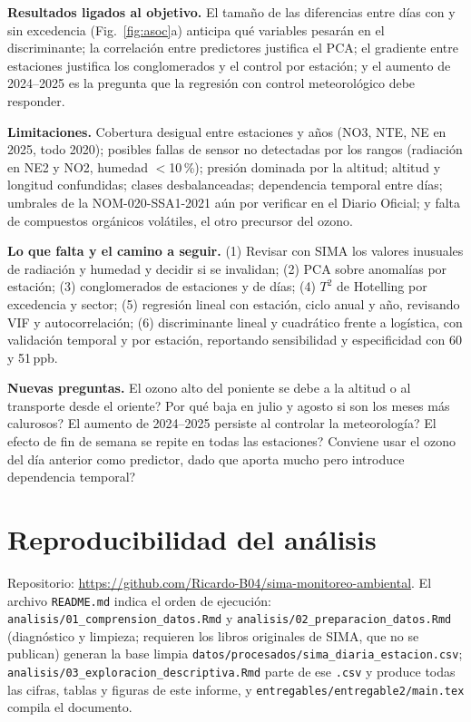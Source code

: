 \documentclass[11pt,letterpaper]{article}
\begin{document}
\textbf{Resultados ligados al objetivo.} El tama\~no de las diferencias entre d\'ias con y sin excedencia (Fig.~\ref{fig:asoc}a) anticipa qu\'e variables pesar\'an en el discriminante; la correlaci\'on entre predictores justifica el PCA; el gradiente entre estaciones justifica los conglomerados y el control por estaci\'on; y el aumento de 2024--2025 es la pregunta que la regresi\'on con control meteorol\'ogico debe responder.

\textbf{Limitaciones.} Cobertura desigual entre estaciones y a\~nos (NO3, NTE, NE en 2025, todo 2020); posibles fallas de sensor no detectadas por los rangos (radiaci\'on en NE2 y NO2, humedad $<$10\,\%); presi\'on dominada por la altitud; altitud y longitud confundidas; clases desbalanceadas; dependencia temporal entre d\'ias; umbrales de la NOM-020-SSA1-2021 a\'un por verificar en el Diario Oficial; y falta de compuestos org\'anicos vol\'atiles, el otro precursor del ozono.

\textbf{Lo que falta y el camino a seguir.} (1) Revisar con SIMA los valores inusuales de radiaci\'on y humedad y decidir si se invalidan; (2) PCA sobre anomal\'ias por estaci\'on; (3) conglomerados de estaciones y de d\'ias; (4) $T^2$ de Hotelling por excedencia y sector; (5) regresi\'on lineal con estaci\'on, ciclo anual y a\~no, revisando VIF y autocorrelaci\'on; (6) discriminante lineal y cuadr\'atico frente a log\'istica, con validaci\'on temporal y por estaci\'on, reportando sensibilidad y especificidad con 60 y 51\,ppb.

\textbf{Nuevas preguntas.} \textquestiondown El ozono alto del poniente se debe a la altitud o al transporte desde el oriente? \textquestiondown Por qu\'e baja en julio y agosto si son los meses m\'as calurosos? \textquestiondown El aumento de 2024--2025 persiste al controlar la meteorolog\'ia? \textquestiondown El efecto de fin de semana se repite en todas las estaciones? \textquestiondown Conviene usar el ozono del d\'ia anterior como predictor, dado que aporta mucho pero introduce dependencia temporal?

\section{Reproducibilidad del an\'alisis}
Repositorio: \url{https://github.com/Ricardo-B04/sima-monitoreo-ambiental}. El archivo \nolinkurl{README.md} indica el orden de ejecuci\'on: \nolinkurl{analisis/01_comprension_datos.Rmd} y \nolinkurl{analisis/02_preparacion_datos.Rmd} (diagn\'ostico y limpieza; requieren los libros originales de SIMA, que no se publican) generan la base limpia \nolinkurl{datos/procesados/sima_diaria_estacion.csv}; \nolinkurl{analisis/03_exploracion_descriptiva.Rmd} parte de ese \texttt{.csv} y produce todas las cifras, tablas y figuras de este informe, y \nolinkurl{entregables/entregable2/main.tex} compila el documento.
\end{document}
